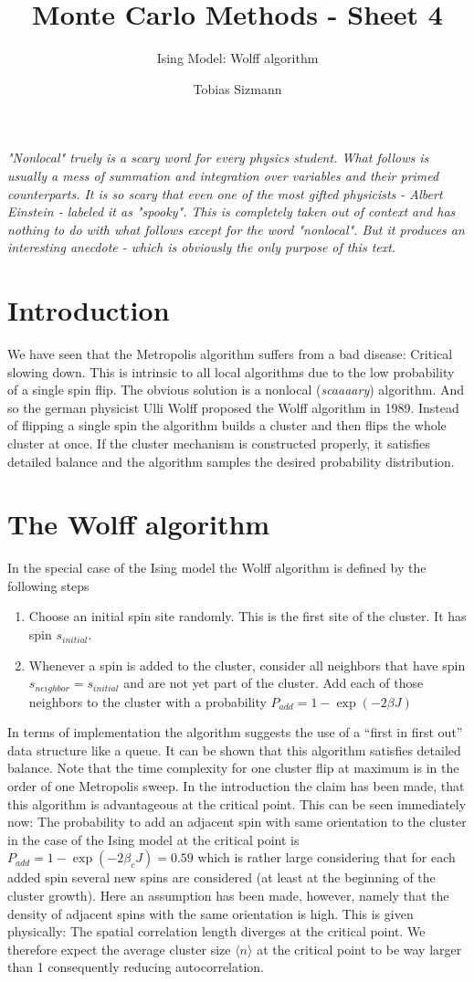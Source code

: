 \documentclass[11pt, a4paper]{scrartcl}
\title{Monte Carlo Methods - Sheet 4}
\subtitle{Ising Model: Wolff algorithm}
\author{Tobias Sizmann}
\begin{document}
\maketitle
\textit{"Nonlocal" truely is a scary word for every physics student. What follows is usually a mess of summation and integration over variables and their primed counterparts. It is so scary that even one of the most gifted physicists - Albert Einstein - labeled it as "spooky". This is completely taken out of context and has nothing to do with what follows except for the word "nonlocal". But it produces an interesting anecdote - which is obviously the only purpose of this text.}
\section{Introduction}
    We have seen that the Metropolis algorithm suffers from a bad disease: Critical slowing down. This is intrinsic to all local algorithms due to the low probability of a single spin flip. The obvious solution is a nonlocal (\textit{scaaaary}) algorithm. And so the german physicist Ulli Wolff proposed the Wolff algorithm in 1989. Instead of flipping a single spin the algorithm builds a cluster and then flips the whole cluster at once. If the cluster mechanism is constructed properly, it satisfies detailed balance and the algorithm samples the desired probability distribution.
\section{The Wolff algorithm}
    In the special case of the Ising model the Wolff algorithm is defined by the following steps
    \begin{enumerate}
        \item Choose an initial spin site randomly. This is the first site of the cluster. It has spin $s_{initial}$.
        \item Whenever a spin is added to the cluster, consider all neighbors that have spin $s_{neighbor} = s_{initial}$ and are not yet part of the cluster. Add each of those neighbors to the cluster with a probability $P_{add} = 1 - \exp(-2 \beta J)$
    \end{enumerate}
    In terms of implementation the algorithm suggests the use of a ``first in first out'' data structure like a queue. It can be shown that this algorithm satisfies detailed balance. Note that the time complexity for one cluster flip at maximum is in the order of one Metropolis sweep. In the introduction the claim has been made, that this algorithm is advantageous at the critical point. This can be seen immediately now: The probability to add an adjacent spin with same orientation to the cluster in the case of the Ising model at the critical point is $P_{add} = 1 - \exp(-2 \beta_c J) = 0.59$ which is rather large considering that for each added spin several new spins are considered (at least at the beginning of the cluster growth). Here an assumption has been made, however, namely that the density of adjacent spins with the same orientation is high. This is given physically: The spatial correlation length diverges at the critical point. We therefore expect the average cluster size $\langle n \rangle$ at the critical point to be way larger than 1 consequently reducing autocorrelation.
\end{document}
